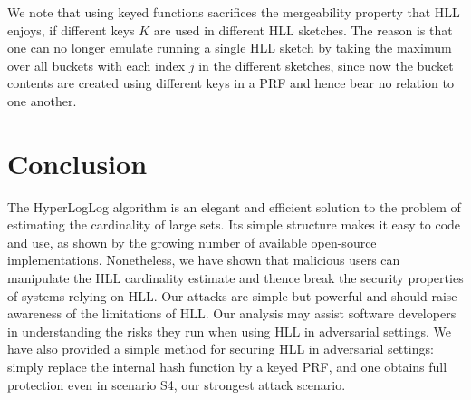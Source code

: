 \documentclass[sigconf, anonymous, dvipsnames]{acmart} %
\begin{document}



We note that using keyed functions sacrifices the mergeability property that HLL enjoys, if different keys $K$ are used in different HLL sketches. The reason is that one can no longer emulate running a single HLL sketch by taking the maximum over all buckets with each index $j$ in the different sketches, since now the bucket contents are created using different keys in a PRF and hence bear no relation to one another. 



\section{Conclusion}\label{sec:conclusions}
The HyperLogLog algorithm is an elegant and efficient solution to the problem of estimating the cardinality of large sets. Its simple structure makes it easy to code and use, as shown by the growing number of available open-source implementations. Nonetheless, we have shown that malicious users can manipulate the HLL cardinality estimate and thence break the security properties of systems relying on HLL. Our attacks are simple but powerful and should raise awareness of the limitations of HLL. Our analysis may assist software developers in understanding the risks they run when using HLL in adversarial settings. We have also provided a simple method for securing HLL in adversarial settings: simply replace the internal hash function by a keyed PRF, and one obtains full protection even in scenario S4, our strongest attack scenario.
\end{document}
